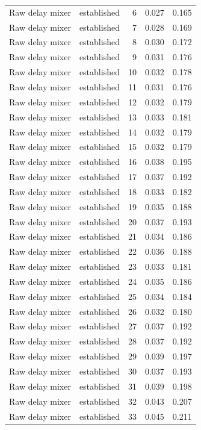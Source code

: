\begin{tabular}{llrrr}
Raw delay mixer & established & 6 & 0.027 & 0.165 \\
Raw delay mixer & established & 7 & 0.028 & 0.169 \\
Raw delay mixer & established & 8 & 0.030 & 0.172 \\
Raw delay mixer & established & 9 & 0.031 & 0.176 \\
Raw delay mixer & established & 10 & 0.032 & 0.178 \\
Raw delay mixer & established & 11 & 0.031 & 0.176 \\
Raw delay mixer & established & 12 & 0.032 & 0.179 \\
Raw delay mixer & established & 13 & 0.033 & 0.181 \\
Raw delay mixer & established & 14 & 0.032 & 0.179 \\
Raw delay mixer & established & 15 & 0.032 & 0.179 \\
Raw delay mixer & established & 16 & 0.038 & 0.195 \\
Raw delay mixer & established & 17 & 0.037 & 0.192 \\
Raw delay mixer & established & 18 & 0.033 & 0.182 \\
Raw delay mixer & established & 19 & 0.035 & 0.188 \\
Raw delay mixer & established & 20 & 0.037 & 0.193 \\
Raw delay mixer & established & 21 & 0.034 & 0.186 \\
Raw delay mixer & established & 22 & 0.036 & 0.188 \\
Raw delay mixer & established & 23 & 0.033 & 0.181 \\
Raw delay mixer & established & 24 & 0.035 & 0.186 \\
Raw delay mixer & established & 25 & 0.034 & 0.184 \\
Raw delay mixer & established & 26 & 0.032 & 0.180 \\
Raw delay mixer & established & 27 & 0.037 & 0.192 \\
Raw delay mixer & established & 28 & 0.037 & 0.192 \\
Raw delay mixer & established & 29 & 0.039 & 0.197 \\
Raw delay mixer & established & 30 & 0.037 & 0.193 \\
Raw delay mixer & established & 31 & 0.039 & 0.198 \\
Raw delay mixer & established & 32 & 0.043 & 0.207 \\
Raw delay mixer & established & 33 & 0.045 & 0.211 \\

\end{tabular}
